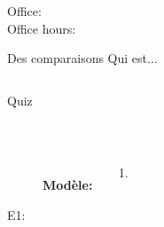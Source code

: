 \documentclass{beamer}
\subtitle[Heures et verbes \lexi{-ir}]{Les heures et les verbes \lexi{-ir}}
\begin{document}
  \begin{frame}
    \titlepage
    \tiny{Office: \\
          Office hours: }
  \end{frame}

  \begin{frame}[t]{Des comparaisons}
    Qui est...
    \vspace{0.5cm}
    \begin{columns}
        \begin{center}
        \end{center}
        \begin{center}
        \end{center}
    \end{columns}
  \end{frame}

  \begin{frame}{}
    \begin{center}
      \Large Quiz
    \end{center}
  \end{frame}

  \begin{frame}{}
     \\
    \tinygloss{}
    \begin{columns}
        \begin{description}
          \item[] \textbf{Modèle:}
          \item[] 
          \item[E1:]
        \end{description}
        \begin{enumerate}
          \item
        \end{enumerate}
    \end{columns}
  \end{frame}
\end{document}
